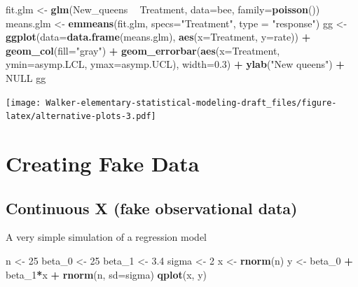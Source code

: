 \documentclass[]{book}
\newenvironment{Shaded}{\begin{snugshade}}{\end{snugshade}}
\newcommand{\KeywordTok}[1]{\textcolor[rgb]{0.13,0.29,0.53}{\textbf{#1}}}
\newcommand{\DataTypeTok}[1]{\textcolor[rgb]{0.13,0.29,0.53}{#1}}
\newcommand{\DecValTok}[1]{\textcolor[rgb]{0.00,0.00,0.81}{#1}}
\newcommand{\FloatTok}[1]{\textcolor[rgb]{0.00,0.00,0.81}{#1}}
\newcommand{\StringTok}[1]{\textcolor[rgb]{0.31,0.60,0.02}{#1}}
\newcommand{\OtherTok}[1]{\textcolor[rgb]{0.56,0.35,0.01}{#1}}
\newcommand{\OperatorTok}[1]{\textcolor[rgb]{0.81,0.36,0.00}{\textbf{#1}}}
\newcommand{\NormalTok}[1]{#1}
\theoremstyle{definition}
\theoremstyle{definition}
\theoremstyle{definition}
\theoremstyle{remark}
\begin{document}
\begin{Shaded}
\begin{Highlighting}[]
\NormalTok{fit.glm <-}\StringTok{ }\KeywordTok{glm}\NormalTok{(New_queens }\OperatorTok{~}\StringTok{ }\NormalTok{Treatment, }\DataTypeTok{data=}\NormalTok{bee, }\DataTypeTok{family=}\KeywordTok{poisson}\NormalTok{())}
\NormalTok{means.glm <-}\StringTok{ }\KeywordTok{emmeans}\NormalTok{(fit.glm, }\DataTypeTok{specs=}\StringTok{"Treatment"}\NormalTok{, }\DataTypeTok{type =} \StringTok{"response"}\NormalTok{)}
\NormalTok{gg <-}\StringTok{ }\KeywordTok{ggplot}\NormalTok{(}\DataTypeTok{data=}\KeywordTok{data.frame}\NormalTok{(means.glm), }\KeywordTok{aes}\NormalTok{(}\DataTypeTok{x=}\NormalTok{Treatment, }\DataTypeTok{y=}\NormalTok{rate)) }\OperatorTok{+}
\StringTok{  }\KeywordTok{geom_col}\NormalTok{(}\DataTypeTok{fill=}\StringTok{"gray"}\NormalTok{) }\OperatorTok{+}\StringTok{ }
\StringTok{  }\KeywordTok{geom_errorbar}\NormalTok{(}\KeywordTok{aes}\NormalTok{(}\DataTypeTok{x=}\NormalTok{Treatment, }\DataTypeTok{ymin=}\NormalTok{asymp.LCL, }\DataTypeTok{ymax=}\NormalTok{asymp.UCL), }\DataTypeTok{width=}\FloatTok{0.3}\NormalTok{) }\OperatorTok{+}
\StringTok{  }\KeywordTok{ylab}\NormalTok{(}\StringTok{"New queens"}\NormalTok{) }\OperatorTok{+}
\StringTok{  }\OtherTok{NULL}
\NormalTok{gg}
\end{Highlighting}
\end{Shaded}

\texttt{[image: Walker-elementary-statistical-modeling-draft\_files/figure-latex/alternative-plots-3.pdf]}

\section{Creating Fake Data}\label{creating-fake-data}

\subsection{Continuous X (fake observational
data)}\label{continuous-x-fake-observational-data}

A very simple simulation of a regression model

\begin{Shaded}
\begin{Highlighting}[]
\NormalTok{n <-}\StringTok{ }\DecValTok{25}
\NormalTok{beta_}\DecValTok{0}\NormalTok{ <-}\StringTok{ }\DecValTok{25}
\NormalTok{beta_}\DecValTok{1}\NormalTok{ <-}\StringTok{ }\FloatTok{3.4}
\NormalTok{sigma <-}\StringTok{ }\DecValTok{2}
\NormalTok{x <-}\StringTok{ }\KeywordTok{rnorm}\NormalTok{(n)}
\NormalTok{y <-}\StringTok{ }\NormalTok{beta_}\DecValTok{0} \OperatorTok{+}\StringTok{ }\NormalTok{beta_}\DecValTok{1}\OperatorTok{*}\NormalTok{x }\OperatorTok{+}\StringTok{ }\KeywordTok{rnorm}\NormalTok{(n, }\DataTypeTok{sd=}\NormalTok{sigma)}
\KeywordTok{qplot}\NormalTok{(x, y)}
\end{Highlighting}
\end{Shaded}
\end{document}

